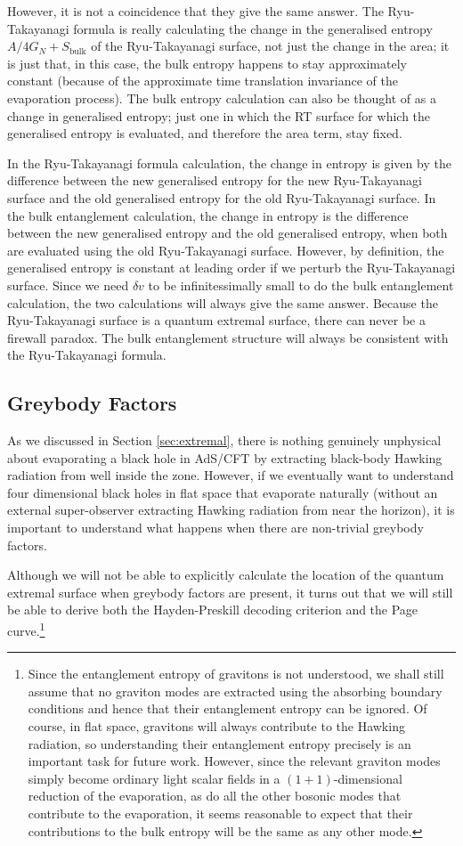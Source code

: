 \documentclass[11pt,a4paper]{article}
\begin{document}
However, it is not a coincidence that they give the same answer. The Ryu-Takayanagi formula is really calculating the change in the generalised entropy $A/4G_N + S_\text{bulk}$ of the Ryu-Takayanagi surface, not just the change in the area; it is just that, in this case, the bulk entropy happens to stay approximately constant (because of the approximate time translation invariance of the evaporation process). The bulk entropy calculation can also be thought of as a change in generalised entropy; just one in which the RT surface for which the generalised entropy is evaluated, and therefore the area term, stay fixed. 

In the Ryu-Takayanagi formula calculation, the change in entropy is given by the difference between the new generalised entropy for the new Ryu-Takayanagi surface and the old generalised entropy for the old Ryu-Takayanagi surface. In the bulk entanglement calculation, the change in entropy is the difference between the new generalised entropy and the old generalised entropy, when both are evaluated using the old Ryu-Takayanagi surface. However, by definition, the generalised entropy is constant at leading order if we perturb the Ryu-Takayanagi surface. Since we need $\delta v$ to be infinitessimally small to do the bulk entanglement calculation, the two calculations will always give the same answer. Because the Ryu-Takayanagi surface is a quantum extremal surface, there can never be a firewall paradox. The bulk entanglement structure will always be consistent with the Ryu-Takayanagi formula.

\subsection{Greybody Factors} \label{sec:greybody}
As we discussed in Section \ref{sec:extremal}, there is nothing genuinely unphysical about evaporating a black hole in AdS/CFT by extracting black-body Hawking radiation from well inside the zone. However,  if we eventually want to understand four dimensional black holes in flat space that evaporate naturally (without an external super-observer extracting Hawking radiation from near the horizon), it is important to understand what happens when there are non-trivial greybody factors. 

Although we will not be able to explicitly calculate the location of the quantum extremal surface when greybody factors are present, it turns out that we will still be able to derive both the Hayden-Preskill decoding criterion and the Page curve.\footnote{Since the entanglement entropy of gravitons is not understood, we shall still assume that no graviton modes are extracted using the absorbing boundary conditions and hence that their entanglement entropy can be ignored. Of course, in flat space, gravitons will always contribute to the Hawking radiation, so understanding their entanglement entropy precisely is an important task for future work. However, since the relevant graviton modes simply become ordinary light scalar fields in a $(1+1)$-dimensional reduction of the evaporation, as do all the other bosonic modes that contribute to the evaporation, it seems reasonable to expect that their contributions to the bulk entropy will be the same as any other mode.}
\end{document}
